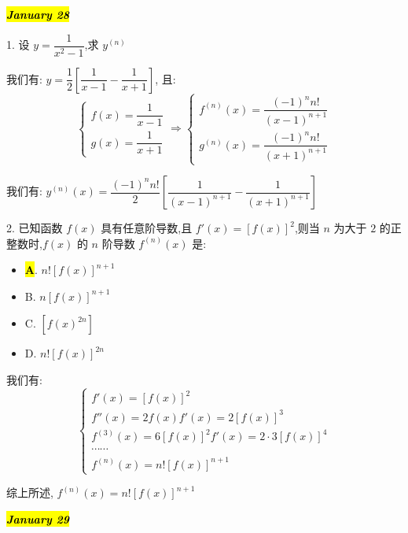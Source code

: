 \hl{\textbf{\textit{January 28}}}

1. 设 $y=\dfrac{1}{x^{2}-1}$,求 $y^{(n)}$
\begin{solution}

	我们有: $y = \dfrac{1}{2}\left[\dfrac{1}{x-1}-\dfrac{1}{x+1}\right]$, 且:
	$$\begin{cases} 
	f(x) = \dfrac{1}{x-1}\\
	g(x) =\dfrac{1}{x+1}
	\end{cases}\Rightarrow 
	\begin{cases}
	f^{(n)}(x) = \dfrac{(-1)^{n}n!}{(x-1)^{n+1}}\\
	g^{(n)}(x) = \dfrac{(-1)^{n}n!}{(x+1)^{n+1}}
	\end{cases}$$
	
	我们有: $y^{(n)}(x) = \dfrac{(-1)^{n}n!}{2}\left[\dfrac{1}{(x-1)^{n+1}}-\dfrac{1}{(x+1)^{n+1}}\right]$
\end{solution}

2. 已知函数 $f(x)$ 具有任意阶导数,且 $f'(x)=[f(x)]^{2}$,则当 $n$ 为大于 $2$ 的正整数时,$f(x)$ 的 $n$ 阶导数 $f^{(n)}(x)$ 是:
\begin{itemize}
	\item \hl{\textbf{A}}. $n![f(x)]^{n+1}$
	\item B. $n[f(x)]^{n+1}$
	\item C. $[f(x)^{2n}]$
	\item D. $n![f(x)]^{2n}$
\end{itemize}
\begin{solution}

	我们有:
	$$\begin{cases}
	f'(x) = [f(x)]^{2}\\
	f''(x) = 2f(x)f'(x) = 2[f(x)]^{3}\\
	f^{(3)}(x) = 6[f(x)]^{2}f'(x) = 2\cdot 3[f(x)]^{4}\\
	\cdots\cdots\\
	f^{(n)}(x) = n![f(x)]^{n+1} 
	\end{cases}$$

	综上所述, $f^{(n)}(x) = n![f(x)]^{n+1}$
\end{solution}

\hl{\textbf{\textit{January 29}}}

